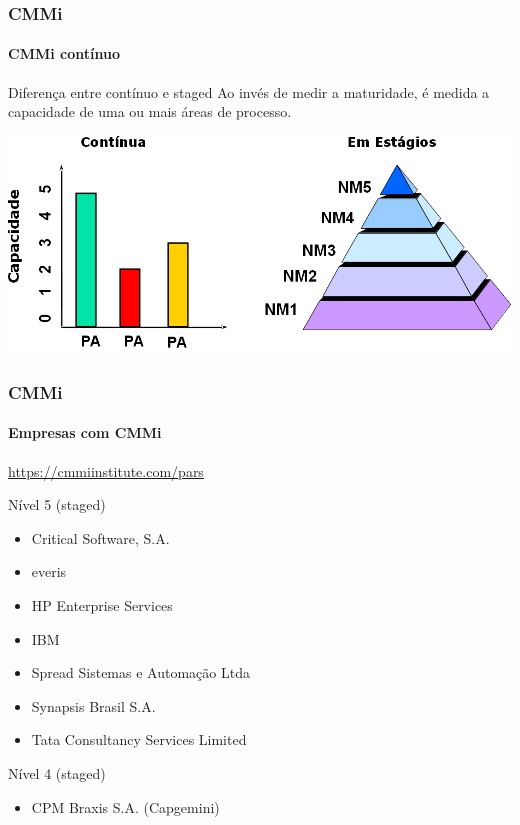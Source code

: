 \begin{frame}
	\frametitle{CMMi}
	\framesubtitle{CMMi contínuo}
	
	\begin{block:fact}{Diferença entre contínuo e staged}
		Ao invés de medir a maturidade, é medida a capacidade de uma ou mais áreas
		de processo.
	\end{block:fact}
	
	\begin{block:fact}{}
		\centering
		\includegraphics[width=\textwidth]{software-engineering/project-management/process/process-quality/cmmi/cmmi-continuous}
	\end{block:fact}
\end{frame}



\begin{frame}
	\frametitle{CMMi}
	\framesubtitle{Empresas com CMMi}
	
	\begin{block:fact}{}
		\url{https://cmmiinstitute.com/pars}
	\end{block:fact}
	
	\begin{block:fact}{Nível 5 (staged)}
		\begin{itemize}
			\item Critical Software, S.A.
			\item everis
			\item HP Enterprise Services
			\item IBM
			\item Spread Sistemas e Automação Ltda
			\item Synapsis Brasil S.A.
			\item Tata Consultancy Services Limited
		\end{itemize}
	\end{block:fact}

		\begin{block:fact}{Nível 4 (staged)}
		\begin{itemize}
			\item CPM Braxis S.A. (Capgemini)
		\end{itemize}
	\end{block:fact}
\end{frame}


